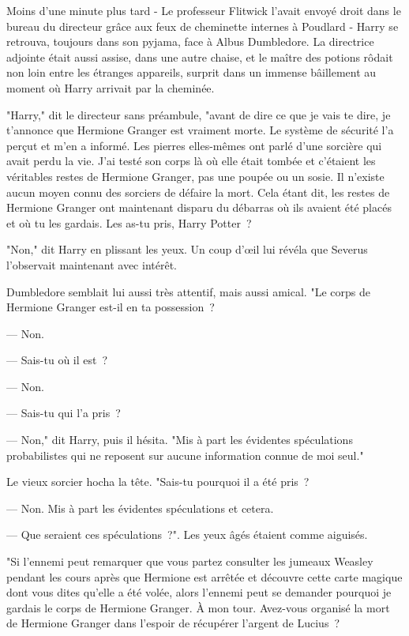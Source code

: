 Moins d'une minute plus tard - Le professeur Flitwick l'avait envoyé droit dans le bureau du directeur grâce aux feux de cheminette internes à Poudlard - Harry se retrouva, toujours dans son pyjama, face à Albus Dumbledore. La directrice adjointe était aussi assise, dans une autre chaise, et le maître des potions rôdait non loin entre les étranges appareils, surprit dans un immense bâillement au moment où Harry arrivait par la cheminée.

"Harry," dit le directeur sans préambule, "avant de dire ce que je vais te dire, je t'annonce que Hermione Granger est vraiment morte. Le système de sécurité l'a perçut et m'en a informé. Les pierres elles-mêmes ont parlé d'une sorcière qui avait perdu la vie. J'ai testé son corps là où elle était tombée et c'étaient les véritables restes de Hermione Granger, pas une poupée ou un sosie. Il n'existe aucun moyen connu des sorciers de défaire la mort. Cela étant dit, les restes de Hermione Granger ont maintenant disparu du débarras où ils avaient été placés et où tu les gardais. Les as-tu pris, Harry Potter~?

"Non," dit Harry en plissant les yeux. Un coup d'œil lui révéla que Severus l'observait maintenant avec intérêt.

Dumbledore semblait lui aussi très attentif, mais aussi amical. "Le corps de Hermione Granger est-il en ta possession~?

--- Non.

--- Sais-tu où il est~?

--- Non.

--- Sais-tu qui l'a pris~?

--- Non," dit Harry, puis il hésita. "Mis à part les évidentes spéculations probabilistes qui ne reposent sur aucune information connue de moi seul."

Le vieux sorcier hocha la tête. "Sais-tu pourquoi il a été pris~?

--- Non. Mis à part les évidentes spéculations et cetera.

--- Que seraient ces spéculations~?". Les yeux âgés étaient comme aiguisés.

"Si l'ennemi peut remarquer que vous partez consulter les jumeaux Weasley pendant les cours après que Hermione est arrêtée et découvre cette carte magique dont vous dites qu'elle a été volée, alors l'ennemi peut se demander pourquoi je gardais le corps de Hermione Granger. À mon tour. Avez-vous organisé la mort de Hermione Granger dans l'espoir de récupérer l'argent de Lucius~?

